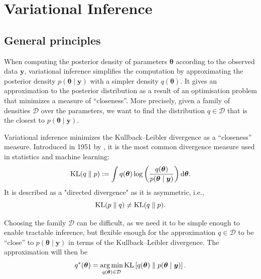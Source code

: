 \documentclass[a4paper, 11pt]{report}
\numberwithin{equation}{chapter}
\DeclareMathOperator*{\argmin}{arg\,min}
\DeclareMathOperator*{\KL}{{\rm KL}}
\begin{document}
\chapter{Variational Inference}
\section{General principles} \label{sec:gen_princ}
When computing the posterior density of parameters $\boldsymbol{\theta}$ according to the observed data $\boldsymbol{y}$, variational inference simplifies the computation by approximating the posterior density $p(\boldsymbol{\theta}\mid \boldsymbol{y})$ with a simpler density $q(\boldsymbol{\theta})$. It gives an approximation to the posterior distribution as a result of an optimisation problem that minimizes a measure of ``closeness''. More precisely, given a family of densities $\mathcal{D}$ over the parameters, we want to find the distribution $q \in \mathcal{D}$ that is the closest to $p(\boldsymbol{\theta} \mid \boldsymbol{y})$.

Variational inference minimizes the Kullback--Leibler divergence as a ``closeness'' measure. Introduced in 1951 by \citet{kl51}, it is the most common divergence measure used in statistics and machine learning:
\begin{equation*}
\KL(q\parallel p) := \int q(\boldsymbol{\theta})\log \left(\frac{q(\boldsymbol{\theta})}{p(\boldsymbol{\theta} \mid \boldsymbol{y})}\right) \mathrm{d}\boldsymbol{\theta}.
\end{equation*} 
It is described as a "directed divergence" as it is asymmetric, i.e.,
$$
\KL(p\parallel q) \neq \KL(q \parallel p).
$$

Choosing the family $\mathcal{D}$ can be difficult, as we need it to be simple enough to enable tractable inference, but flexible enough for the approximation $q \in \mathcal{D}$ to be ``close'' to $p(\boldsymbol{\theta} \mid \boldsymbol{y})$ in terms of the Kullback--Leibler divergence. The approximation will then be
\begin{equation*}
q^*(\boldsymbol{\theta} ) = \argmin_{q(\boldsymbol{\theta}) \in \mathcal{D}} \KL\left[ q(\boldsymbol{\theta}) \parallel p(\boldsymbol{\theta} \mid \boldsymbol{y})\right].
\end{equation*}
\end{document}
